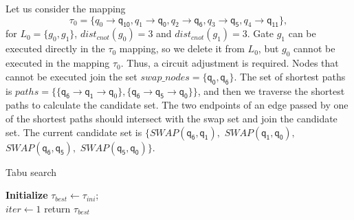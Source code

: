 \documentclass[runningheads]{llncs}
\begin{document}
\begin{example}
	Let us consider the mapping $$\tau_{0}=\{\textit{q}_\textit{0}\rightarrow  \textsf{q}_{\textsf{10}},\textit{q}_\textit{1}\rightarrow \textsf{q}_{\textsf{0}},
\textit{q}_\textit{2}\rightarrow  \textsf{q}_{\textsf{6}},\textit{q}_\textit{3}\rightarrow  \textsf{q}_{\textsf{5}},\textit{q}_\textit{4}\rightarrow  \textsf{q}_{\textsf{11}}\} , $$ 
for $L_{0}=\{g_{0},g_{1}\}$, $dist_{cnot}(g_{0})=3$ and $dist_{cnot}(g_{1})=3$. 
Gate $g_{1}$ can be executed directly in the $\tau_{0}$ mapping, so we delete it from $L_{0}$,
but $g_{0}$ cannot be executed in the mapping $\tau_{0}$.
Thus, a circuit adjustment is required. 
Nodes that cannot be executed join the set $swap\_nodes=\{\textsf{q}_{\textsf{0}},\textsf{q}_\textsf{6}\}$.
The set of shortest paths is $paths=\{\{\textsf{q}_{\textsf{6}}\rightarrow \textsf{q}_{\textsf{1}} \rightarrow \textsf{q}_{0} \},\{\textsf{q}_\textsf{6}\rightarrow \textsf{q}_\textsf{5} \rightarrow \textsf{q}_\textsf{0} \}\}$, 
and then we traverse the shortest paths to calculate the  candidate set.
The two endpoints of an edge passed by one of the shortest paths should intersect with the swap set and join the candidate set.
The current candidate set is $\{SWAP(\textsf{q}_\textsf{6},\textsf{q}_\textsf{1}),$ $SWAP(\textsf{q}_\textsf{1},\textsf{q}_\textsf{0}),$ $SWAP(\textsf{q}_\textsf{6},\textsf{q}_\textsf{5}),$ $SWAP(\textsf{q}_\textsf{5},\textsf{q}_\textsf{0}) \}$.
\end{example}

	\begin{algorithm}[!ht] 
		\label{algorithm_Tabu}
			\caption{Tabu search }  
			\LinesNumbered  
			\textbf{Initialize}
				$\tau_{best}  \leftarrow \tau_{ini}$; \\
				$iter \leftarrow 1$  
			return $\tau_{best}$
	\end{algorithm}
        
\end{document}
